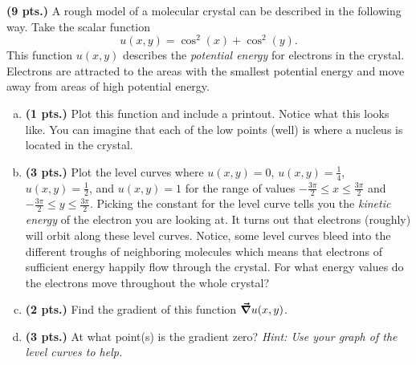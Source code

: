 \documentclass[12pt]{article} %
\begin{document}
\vspace*{0.5cm}

\begin{problem}
\textbf{(9 pts.)} A rough model of a molecular crystal can be described in the following way. Take the scalar function
\[
u(x,y)=\cos^2(x)+\cos^2(y).
\]
This function $u(x,y)$ describes the \emph{potential energy} for electrons in the crystal. Electrons are attracted to the areas with the smallest potential energy and move away from areas of high potential energy.
\begin{enumerate}[(a)]
    \item \textbf{(1 pts.)} Plot this function and include a printout.  Notice what this looks like.  You can imagine that each of the low points (well) is where a nucleus is located in the crystal.
    \item \textbf{(3 pts.)} Plot the level curves where $u(x,y)=0$, $u(x,y)=\frac{1}{4}$, $u(x,y)=\frac{1}{2}$, and $u(x,y)=1$ for the range of values $-\frac{3\pi}{2}\leq x \leq \frac{3\pi}{2}$ and $-\frac{3\pi}{2}\leq y \leq \frac{3\pi}{2}$. Picking the constant for the level curve tells you the \emph{kinetic energy} of the electron you are looking at.  It turns out that electrons (roughly) will orbit along these level curves.  Notice, some level curves bleed into the different troughs of neighboring molecules which means that electrons of sufficient energy happily flow through the crystal. For what energy values do the electrons move throughout the whole crystal?
    \item \textbf{(2 pts.)} Find the gradient of this function $\boldsymbol{\vec{\nabla}} u(x,y)$.
    \item \textbf{(3 pts.)} At what point(s) is the gradient zero? \emph{Hint: Use your graph of the level curves to help.}
    \end{enumerate}
\end{problem}
\end{document}
